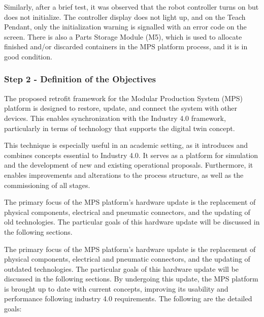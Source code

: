 \documentclass[journal]{IEEEtran}
\begin{document}
Similarly, after a brief test, it was observed that the robot controller turns on but does not initialize. The controller display does not light up, and on the Teach Pendant, only the initialization warning is signalled with an error code on the screen. There is also a Parts Storage Module (M5), which is used to allocate finished and/or discarded containers in the MPS platform process, and it is in good condition.

\subsubsection{Step 2 - Definition of the Objectives}

The proposed retrofit framework for the Modular Production System (MPS) platform is designed to restore, update, and connect the system with other devices. This enables synchronization with the Industry 4.0 framework, particularly in terms of technology that supports the digital twin concept.

This technique is especially useful in an academic setting, as it introduces and combines concepts essential to Industry 4.0. It serves as a platform for simulation and the development of new and existing operational proposals. Furthermore, it enables improvements and alterations to the process structure, as well as the commissioning of all stages.

The primary focus of the MPS platform's hardware update is the replacement of physical components, electrical and pneumatic connectors, and the updating of old technologies. The particular goals of this hardware update will be discussed in the following sections. 

The primary focus of the MPS platform's hardware update is the replacement of physical components, electrical and pneumatic connectors, and the updating of outdated technologies. The particular goals of this hardware update will be discussed in the following sections. By undergoing this update, the MPS platform is brought up to date with current concepts, improving its usability and performance following industry 4.0 requirements. The following are the detailed goals:
\end{document}
